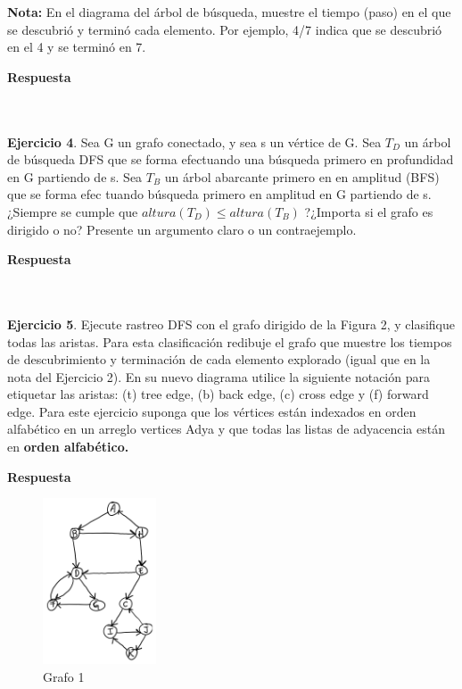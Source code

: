 \documentclass[12pt]{article}
\begin{document}
\textbf{Nota:} En el diagrama del árbol de búsqueda, muestre el tiempo (paso) en el que se
descubrió y terminó cada elemento. Por ejemplo, 4/7 indica que se descubrió en el 4 y se
terminó en 7.

\par \textbf{Respuesta}






\par\ \\\ \\\noindent
\textbf{Ejercicio 4}. Sea G un grafo conectado, y sea s un vértice de G. Sea $T_D$ un árbol de búsqueda DFS que se forma efectuando una búsqueda primero en profundidad en G partiendo de s. Sea $T_B$ un árbol abarcante primero en en amplitud (BFS) que se forma efec tuando búsqueda primero en amplitud en G partiendo de s. ¿Siempre se cumple que $altura(T_D ) \leq altura(T_B )$ ?¿Importa si el grafo es dirigido o no? Presente un argumento claro o un contraejemplo.

\par \textbf{Respuesta}







\par\ \\\ \\\noindent
\textbf{Ejercicio 5}. Ejecute rastreo DFS con el grafo dirigido de la Figura 2, y clasifique todas las aristas. Para esta clasificación redibuje el grafo que muestre los tiempos de descubrimiento y terminación de cada elemento explorado (igual que en la nota del Ejercicio 2). En su nuevo diagrama utilice la siguiente notación para etiquetar las aristas: (t) tree edge, (b) back edge, (c) cross edge y (f) forward edge. Para este ejercicio suponga que los vértices están indexados en orden alfabético en un arreglo vertices Adya y que todas las listas de adyacencia están en {\Large\bf orden alfabético.}

\par \textbf{Respuesta}





\begin{figure}[h]
	\centering
	\includegraphics[width=0.3\textwidth]{grafo2.png}
	\caption{Grafo 1}
	\label{fig: 1}
\end{figure}
\end{document}
